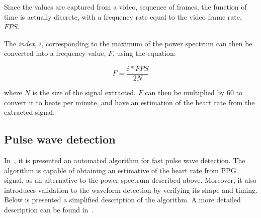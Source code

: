 Since the values are captured from a video, sequence of frames, the function
of time is actually discrete, with a frequency rate equal to the video frame
rate, $FPS$.

The \emph{index}, $i$, corresponding to the maximum of the power spectrum can
then be converted into a frequency value, $F$, using the equation:

\begin{equation}
  F = \frac{i * FPS}{2 N}
\end{equation}

where $N$ is the size of the signal extracted. $F$ can then be multiplied by
$60$ to convert it to beats per minute, and have an estimation of the heart
rate from the extracted signal.

\subsection{Pulse wave detection} \label{sec:sota:estimation:pulse}

In~\cite{Nenova2010Automated}, it is presented an automated algorithm
for fast pulse wave detection. The algorithm is capable of obtaining an
estimative of the heart rate from PPG signal, as an alternative to the power
spectrum described above. Moreover, it also introduces validation to the
waveform detection by verifying its shape and timing. Below is presented a
simplified description of the algorithm. A more detailed description can be
found in~\cite{Nenova2010Automated}.

